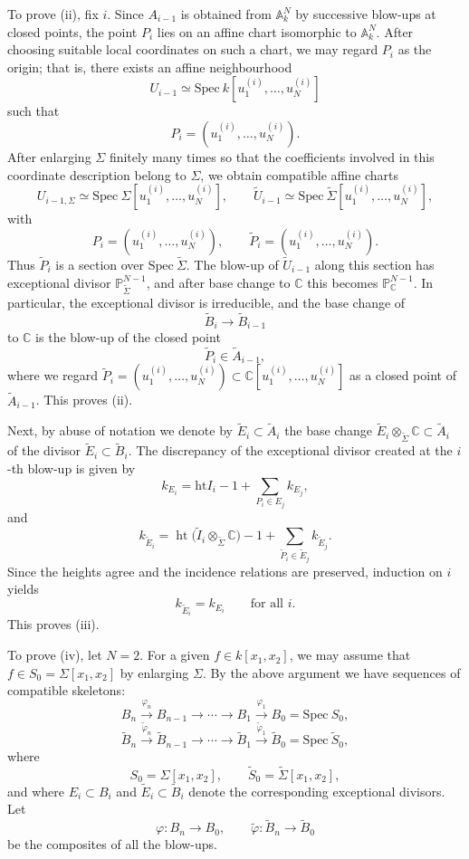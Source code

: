 \documentclass[a4paper]{amsart}
\def\AA{{\mathbb{A}}}
\def\CC{{\mathbb{C}}}
\newcommand{\spec}{{\mathrm{Spec \ }}}
\newcommand{\height}{{\mathrm{ht} }}
\newcommand{\we}{{\widetilde E}}
\newcommand{\wB}{{\widetilde{B}}}
\newcommand{\wa}{{\widetilde{A}}}
\newcommand{\wsig}{{\widetilde{\Sigma}}}
\newcommand{\tP}{{\widetilde{P}}}
\newcommand{\wv}{{\widetilde{\varphi}}}
\theoremstyle{definition}
\begin{document}
To prove {\rm (ii)}, fix $i$. Since $A_{i-1}$ is obtained from $\AA_k^N$ by
successive blow-ups at closed points, the point $P_i$ lies on an affine chart
isomorphic to $\AA_k^N$. After choosing suitable local coordinates on such
a chart, we may regard $P_i$ as the origin; that is, there exists an affine
neighbourhood
\[
U_{i-1}\simeq \spec k[u_1^{(i)},\dots,u_N^{(i)}]
\]
such that
\[
P_i=(u_1^{(i)},\dots,u_N^{(i)}).
\]
After enlarging $\Sigma$ finitely many times so that the coefficients involved in
this coordinate description belong to $\Sigma$, we obtain compatible affine charts
\[
U_{i-1,\Sigma}\simeq \spec \Sigma[u_1^{(i)},\dots,u_N^{(i)}],
\qquad
\widetilde U_{i-1}\simeq
\spec \widetilde\Sigma[u_1^{(i)},\dots,u_N^{(i)}],
\]
with
\[
P_i=(u_1^{(i)},\dots,u_N^{(i)}),
\qquad
\tP_i=(u_1^{(i)},\dots,u_N^{(i)}).
\]
Thus $\tP_i$ is a section over $\spec \widetilde\Sigma$. The blow-up of
$\widetilde U_{i-1}$ along this section has exceptional divisor
$\mathbb P^{N-1}_{\widetilde\Sigma}$, and after base change to $\CC$ this
becomes $\mathbb P^{N-1}_{\CC}$. In particular, the exceptional divisor is
irreducible, and the base change of
\[
\wB_i\to \wB_{i-1}
\]
to $\CC$ is the blow-up of the closed point
\[
\tP_i\in \wa_{i-1},
\]
where we regard $\tP_i=(u_1^{(i)},\dots,u_N^{(i)})\subset  \CC[u_1^{(i)},\dots,u_N^{(i)}]$
as a closed point of 
$ \wa_{i-1}$.
This proves {\rm (ii)}.

Next, by abuse of notation we denote by $\we_i\subset \wa_i$
the base change $\we_i\otimes_\wsig\CC\subset \wa_i$
of the divisor $\we_i\subset \wB_i$. 
The discrepancy of the exceptional divisor created at the $i$-th blow-up is given by
\[
k_{E_i}
=
\height I_i -1 + \sum_{P_i\in E_j} k_{E_j},
\]
and
\[
k_{\we_i}
=
\operatorname{ht}\bigl(\widetilde I_i\otimes_{\widetilde\Sigma}\CC\bigr)-1
+\sum_{\tP_i\in \we_j} k_{\we_j}.
\]
Since the heights agree and the incidence relations are preserved, induction on
$i$ yields
\[
k_{\we_i}=k_{E_i}
\qquad\text{for all }i.
\]
This proves {\rm (iii)}.

To prove (iv), let $N=2$.
For a given $f\in k[x_1,x_2]$, we may assume that $f\in S_0=\Sigma[x_1,x_2]$ by
enlarging $\Sigma$.
By the above argument we have sequences of compatible skeletons:
\[
B_n \xrightarrow{\varphi_n} B_{n-1} \to \cdots \to B_1 \xrightarrow{\varphi_1} B_0=\spec S_0,
\]
\[
\widetilde{B}_n \xrightarrow{\wv_n} \widetilde{B}_{n-1}
\to \cdots \to \widetilde{B}_1 \xrightarrow{\wv_1} \widetilde{B}_0=\spec \widetilde{S}_0,
\]
where
\[
S_0=\Sigma[x_1,x_2], \qquad \widetilde{S}_0=\widetilde{\Sigma}[x_1,x_2],
\]
and where \(E_i \subset B_i\) and \(\we_i \subset \widetilde{B}_i\) denote the
corresponding exceptional divisors. Let
\[
\varphi : B_n \to B_0, \qquad \wv : \wB_n \to \wB_0
\]
be the composites of all the blow-ups.
\end{document}
